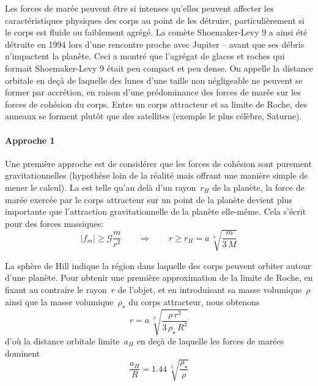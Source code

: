 \sk
Les forces de marée peuvent être si intenses qu'elles peuvent affecter les caractéristiques physiques des corps au point de les détruire, particulièrement si le corps est fluide ou faiblement agrégé. La comète Shoemaker-Levy 9 a ainsi été détruite en 1994 lors d'une rencontre proche avec Jupiter -- avant que ses débris n'impactent la planète. Ceci a montré que l'agrégat de glaces et roches qui formait Shoemaker-Levy 9 était peu compact et peu dense. On appelle  la distance orbitale en deçà de laquelle des lunes d'une taille non négligeable ne peuvent se former par accrétion, en raison d'une prédominance des forces de marée sur les forces de cohésion du corps. Entre un corps attracteur et sa limite de Roche, des anneaux se forment plutôt que des satellites (exemple le plus célèbre, Saturne).

\sk
\paragraph{Approche 1} Une première approche est de considérer que les forces de cohésion sont purement gravitationnelles (hypothèse loin de la réalité mais offrant une manière simple de mener le calcul). La  est telle qu'au delà d'un rayon~$r_H$ de la planète, la force de marée exercée par le corps attracteur sur un point de la planète devient plus importante que l'attraction gravitationnelle de la planète elle-même. Cela s'écrit pour des forces massiques:
\[ |f_m| \geq \mathcal{G} \frac{m}{r^2} \qquad \Rightarrow \qquad r \geq r_H = a \, \sqrt[3]{ \frac{m}{3\,M} } \]

\sk
La sphère de Hill indique la région dans laquelle des corps peuvent orbiter autour d'une planète. Pour obtenir une première approximation de la limite de Roche, en fixant au contraire le rayon~$r$ de l'objet, et en introduisant sa masse volumique~$\rho$ ainsi que la masse volumique~$\rho_{\star}$ du corps attracteur, nous obtenons
\[ r = a \, \sqrt[3]{ \frac{\rho \, r^3}{3\, \rho_{\star} \, R^3} } \]
d'où la distance orbitale limite~$a_H$ en deçà de laquelle les forces de marées dominent
\[ \frac{a_H}{R} = 1.44 \, \sqrt[3]{ \frac{\rho_{\star}}{\rho} } \]

\sk
